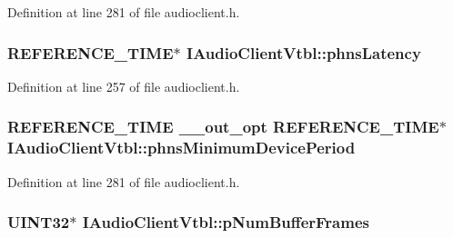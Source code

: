 Definition at line 281 of file audioclient.\+h.

\subsubsection[{\texorpdfstring{phns\+Latency}{phnsLatency}}]{ {\bf R\+E\+F\+E\+R\+E\+N\+C\+E\+\_\+\+T\+I\+ME}$\ast$ I\+Audio\+Client\+Vtbl\+::phns\+Latency}\hypertarget{struct_i_audio_client_vtbl_a9769a8d9ebf61414d53befca3259fddc}{}\label{struct_i_audio_client_vtbl_a9769a8d9ebf61414d53befca3259fddc}


Definition at line 257 of file audioclient.\+h.

\subsubsection[{\texorpdfstring{phns\+Minimum\+Device\+Period}{phnsMinimumDevicePeriod}}]{ {\bf R\+E\+F\+E\+R\+E\+N\+C\+E\+\_\+\+T\+I\+ME} {\bf \+\_\+\+\_\+out\+\_\+opt} {\bf R\+E\+F\+E\+R\+E\+N\+C\+E\+\_\+\+T\+I\+ME}$\ast$ I\+Audio\+Client\+Vtbl\+::phns\+Minimum\+Device\+Period}\hypertarget{struct_i_audio_client_vtbl_a772bb263c9000d5178d4f5157309ff7d}{}\label{struct_i_audio_client_vtbl_a772bb263c9000d5178d4f5157309ff7d}


Definition at line 281 of file audioclient.\+h.

\subsubsection[{\texorpdfstring{p\+Num\+Buffer\+Frames}{pNumBufferFrames}}]{ U\+I\+N\+T32$\ast$ I\+Audio\+Client\+Vtbl\+::p\+Num\+Buffer\+Frames}\hypertarget{struct_i_audio_client_vtbl_af4381df5059bc5e2c153626ae2ecde7f}{}\label{struct_i_audio_client_vtbl_af4381df5059bc5e2c153626ae2ecde7f}


